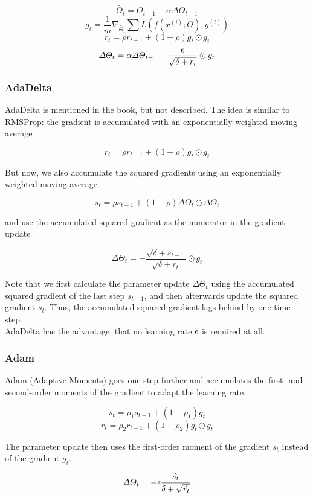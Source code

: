 \begin{multicols}{2}
		\[ \tilde{\Theta_{t}} = \Theta_{t-1} + \alpha \Delta\Theta_{t-1} \]
		\[ g_{t} = \frac{1}{m} \nabla_{\tilde{\Theta_{t}}} \sum L(f(x^{(i)};\tilde{\Theta}),y^{(i)})    \]
		\[ r_{t} = \rho r_{t-1} + (1- \rho) g_{t}\odot g_{t}\]
		\[ \Delta\Theta_{t} = \alpha\Delta\Theta_{t-1} - \frac{{\epsilon}}{\sqrt{\delta + r_{t}}} \odot g_{t} \]

		\subsubsection{AdaDelta}
		AdaDelta is mentioned in the book, but not described. The idea is similar to RMSProp: the gradient is accumulated with an exponentially weighted moving average

		\[ r_{t} = \rho r_{t-1} + (1- \rho) g_{t}\odot g_{t}\]

		But now, we also accumulate the squared gradients using an exponentially weighted moving average

		\[ s_{t} = \rho s_{t-1} + (1 - \rho)\Delta\Theta_{t} \odot \Delta\Theta_{t} \]

		and use the accumulated squared gradient as the numerator in the gradient update

		\[ \Delta\Theta_{t} = - \frac{\sqrt{\delta + s_{t-1}}}{\sqrt{\delta + r_{t}}} \odot g_{t}\]

		Note that we first calculate the parameter update $ \Delta\Theta_{t} $ using the accumulated squared gradient of the last step $ s_{t-1} $, and then afterwards update the squared gradient $ s_{t} $. Thus, the accumulated squared gradient lags behind by one time step.\\
		AdaDelta has the advantage, that no learning rate $ {\epsilon} $ is required at all.

		\subsubsection{Adam}
		Adam (Adaptive Moments) goes one step further and accumulates the first- and second-order moments of the gradient to adapt the learning rate.

		\[ s_{t} = \rho_{1} s_{t-1} + (1 - \rho_{1})g_{t} \]
		\[ r_{t} = \rho_{2} r_{t-1} + (1 - \rho_{2})g_{t} \odot g_{t} \]

		The parameter update then uses the first-order moment of the gradient $ s_{t} $ instead of the gradient $ g_{t} $.

		\[ \Delta\Theta_{t} = -{\epsilon}\frac{\hat{s_{t}}}{\delta + \sqrt{\hat{r_{t}}}} \]


\end{multicols}
